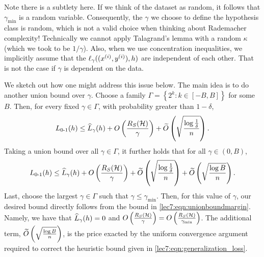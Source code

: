 \begin{remark} \label{lec7:rmk:union_bound_margin}
Note there is a subtlety here. If we think of the dataset as random, it follows that $\gamma_{\min}$ is a random variable. Consequently, the $\gamma$ we choose to define the hypothesis class is random, which is not a valid choice when thinking about Rademacher complexity! Technically we cannot apply Talagrand's lemma with a random $\kappa$ (which we took to be $1/\gamma$). Also, when we use concentration inequalities, we implicitly assume that the $\ell_\gamma((x\sp{i}, y\sp{i}), h)$ are independent of each other. That is not the case if $\gamma$ is dependent on the data.

We sketch out how one might address this issue below. The main idea is to do another union bound over $\gamma$. Choose a family $\Gamma = \left\{ 2^k: k \in [-B, B] \right\}$ for some $B$. Then, for every fixed $\gamma \in \Gamma$, with probability greater than $1 - \delta$,
\begin{align}
\Err(h) \leq \hatL_\gamma (h) + O \left( \frac{R_S(\cH)}{\gamma} \right) + \tilO \left( \sqrt{\frac{\log \frac{1}{\delta}}{n}} \right).
\end{align}
Taking a union bound over all $\gamma \in \Gamma$, it further holds that for all $\gamma \in (0, B)$, 
\begin{align}
    \Err(h) \leq \hatL_\gamma (h) + O \left( \frac{R_S(\cH)}{\gamma} \right) + \tilO \left( \sqrt{\frac{\log \frac{1}{\delta}}{n}}\right) + \tilO \left ( \sqrt{\frac{\log B}{n}} \right ). \label{lec7:eqn:unionboundmargin}
\end{align}
Last, choose the largest $\gamma \in \Gamma$ such that $\gamma \leq \gamma_{\min}$. Then, for this value of $\gamma$, our desired bound directly follows from the bound in \eqref{lec7:eqn:unionboundmargin}. Namely, we have that $\hatL_{\gamma} (h) = 0$ and $O \left( \frac{R_S(\cH)}{\gamma} \right) = O \left( \frac{R_S(\cH)}{\gamma_{\min}} \right)$. The additional term, $\tilO\left ( \sqrt{\frac{\log B}{n} }\right )$, is the price exacted by the uniform convergence argument required to correct the heuristic bound given in \eqref{lec7:eqn:generalization_loss}.

\end{remark}
